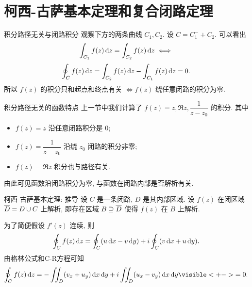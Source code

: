 \section[积分基本定理]{柯西-古萨基本定理和复合闭路定理}


\begin{frame}{积分路径无关与闭路积分}
\onslide<+->
观察下方的两条曲线 $C_1,C_2$.
\onslide<+->
设 $C=C_1^-+C_2$.
\onslide<+->
可以看出
\[\int_{C_1}f(z)\,\mathrm{d} z=\int_{C_2}f(z)\,\mathrm{d} z\iff\]
\[\oint_Cf(z)\,\mathrm{d} z=\int_{C_2}f(z)\,\mathrm{d} z-\int_{C_1}f(z)\,\mathrm{d} z=0.\]
\onslide<+->
所以 $f(z)$ 的积分只和起点和终点有关 $\iff f(z)$ 绕任意闭路的积分为零.
\begin{center}
\end{center}
\end{frame}


\begin{frame}{积分路径无关的函数特点}
\onslide<+->
上一节中我们计算了 $f(z)=z,\Re z,\dfrac1{z-z_0}$ 的积分.
\onslide<+->
其中
\begin{itemize}
\item $f(z)=z$ 沿任意闭路积分是 $0$;
\item $f(z)=\dfrac1{z-z_0}$ 沿绕 $z_0$ 闭路的积分非零;
\item $f(z)=\Re z$ 积分也与路径有关.
\end{itemize}
\onslide<+->
由此可见函数沿闭路积分为零,
\onslide<+->
与函数在闭路内部是否解析有关.
\end{frame}


\begin{frame}{柯西-古萨基本定理: 推导}
\onslide<+->
设 $C$ 是一条闭路, $D$ 是其内部区域.
\onslide<+->
设 $f(z)$ 在闭区域 $\overline D=D\cup C$ 上解析,
\onslide<+->
即存在区域 $B\supseteq\overline D$ 使得 $f(z)$ 在 $B$ 上解析.

\onslide<+->
为了简便假设 $f'(z)$ 连续,
\onslide<+->
则
\[\oint_Cf(z)\,\mathrm{d} z=\oint_C(u\,\mathrm{d} x-v\,\mathrm{d} y)
+i\oint_C(v\,\mathrm{d} x+u\,\mathrm{d} y).\]
\onslide<+->
由格林公式和C-R方程可知
\[\oint_Cf(z)\diff z=-\iint_D(v_x+u_y)\diff x\diff y
+i\iint_D(u_x-v_y)\diff x\diff y
\visible<+->{=0.}\]
\end{frame}


